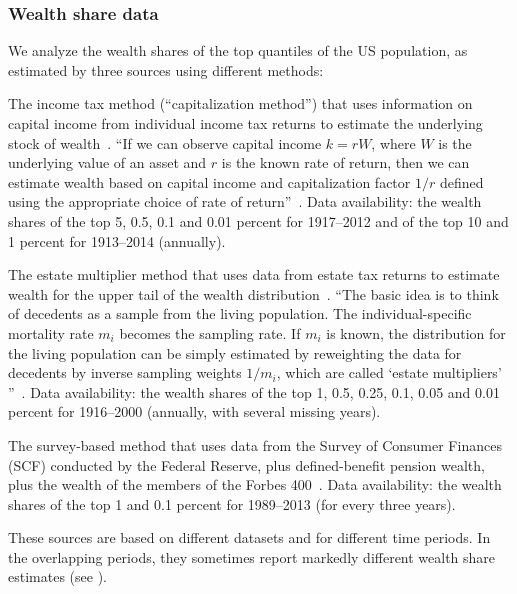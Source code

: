 \subsubsection{Wealth share data}

We analyze the wealth shares of the top quantiles of the US population, as estimated by three sources using different methods:

\bi
\item
The income tax method (``capitalization method'') that uses information on capital income from individual income tax returns to estimate the underlying stock of wealth~\cite{SaezZucman2014,WID2017}. ``If we can observe capital income $k = rW$, where $W$ is the underlying value of an asset and $r$ is the known rate of return, then we can estimate wealth based on capital income and capitalization factor $1/r$ defined using the appropriate choice of rate of return''~\cite[p.~54] {kopczuk2015we}. Data availability: the wealth shares of the top 5, 0.5, 0.1 and 0.01 percent for 1917--2012 and of the top 10 and 1 percent for 1913--2014 (annually).
\item
The estate multiplier method that uses data from estate tax returns to estimate wealth for the upper tail of the wealth distribution~\cite{kopczuk2004top}. ``The basic idea is to think of decedents as a sample from the living population. The individual-specific mortality rate $m_i$ becomes the sampling rate. If $m_i$ is known, the distribution for the living population can be simply estimated by reweighting the data for decedents by inverse sampling weights $1/m_i$, which are called `estate multipliers' ''~\cite[p.~53] {kopczuk2015we}. Data availability: the wealth shares of the top 1, 0.5, 0.25, 0.1, 0.05 and 0.01 percent for 1916--2000 (annually, with several missing years).
\item
The survey-based method that uses data from the Survey of Consumer Finances (SCF) conducted by the Federal Reserve, plus defined-benefit pension wealth, plus the wealth of the members of the Forbes 400~\cite{bricker2016measuring2}. Data availability: the wealth shares of the top 1 and 0.1 percent for 1989--2013 (for every three years).
\ei

These sources are based on different datasets and for different time periods. In the overlapping periods, they sometimes report markedly different wealth share estimates (see ).

